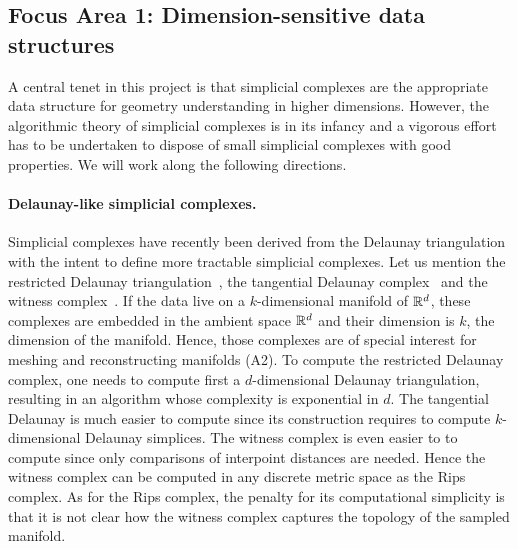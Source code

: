 \subsection*{Focus Area 1:  Dimension-sensitive data structures} 

A central tenet in this project is that simplicial complexes are the appropriate data structure for geometry understanding in higher dimensions. However,
the algorithmic theory of simplicial complexes is in its infancy and a vigorous effort has to be undertaken to dispose of small simplicial complexes with good properties.
We will work along the following directions.



\paragraph{Delaunay-like  simplicial complexes.} 
Simplicial complexes have recently been derived from the Delaunay triangulation with the intent to
define more tractable simplicial complexes. Let us mention the restricted Delaunay triangulation~\cite{he-gtmg-2001}, the tangential Delaunay complex~\cite{geometrica-7142i} and the witness complex~\cite{cds-tewc-2004}. %
If the data live on a $k$-dimensional manifold of $\mathbb R ^d$, these complexes are embedded in the ambient space $\mathbb R^d$ and their dimension is $k$, the dimension of the manifold.  Hence, those complexes are of special interest for meshing and reconstructing manifolds (A2).  To compute the restricted Delaunay complex, one needs to compute first a $d$-dimensional Delaunay triangulation, resulting in an algorithm whose complexity is exponential in $d$. The tangential Delaunay is much easier to compute 
since its construction requires to compute $k$-dimensional Delaunay simplices.
The witness complex is even easier to to compute since only comparisons of interpoint distances are needed. Hence the witness complex can be computed in any discrete metric space as the Rips complex. 
As for the Rips complex, the penalty for its computational simplicity is that it is not clear how the witness complex captures the topology of the sampled manifold. 

